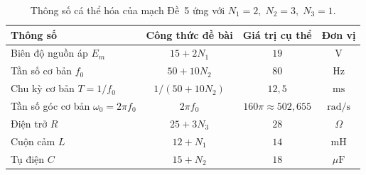 \begin{table}[!htbp]
    \centering
    \caption{Thông số cá thể hóa của mạch Đề~5 ứng với $N_1 = 2,\; N_2 = 3,\; N_3 = 1$.}
    \label{tab:params}
    \vspace{4pt}
    \begin{tabular}{|l|c|c|c|}
        \toprule
        \textbf{Thông số} & \textbf{Công thức đề bài} & \textbf{Giá trị cụ thể} & \textbf{Đơn vị} \\
        \midrule
        Biên độ nguồn áp $E_m$      & $15 + 2N_1$  & $19$     & $\text{V}$ \\
        Tần số cơ bản $f_0$         & $50 + 10N_2$ & $80$     & $\text{Hz}$ \\
        Chu kỳ cơ bản $T = 1/f_0$   & $1/(50+10N_2)$ & $12{,}5$ & $\text{ms}$ \\
        Tần số góc cơ bản $\omega_0 = 2\pi f_0$ & $2\pi f_0$ & $160\pi \approx 502{,}655$ & $\text{rad/s}$ \\
        Điện trở $R$                & $25 + 3N_3$  & $28$     & $\Omega$ \\
        Cuộn cảm $L$                & $12 + N_1$   & $14$     & $\text{mH}$ \\
        Tụ điện $C$                 & $15 + N_2$   & $18$     & $\mu\text{F}$ \\
        \bottomrule
    \end{tabular}
\end{table}


